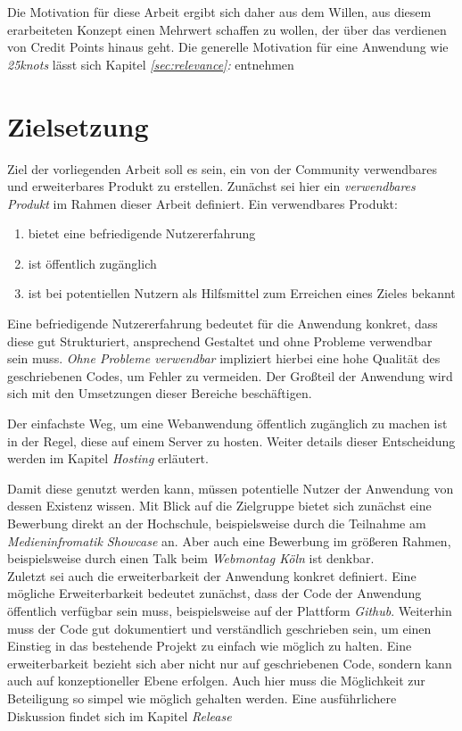 Die Motivation für diese Arbeit ergibt sich daher aus dem Willen, aus diesem erarbeiteten Konzept einen Mehrwert schaffen zu wollen, der über das verdienen von Credit Points hinaus geht. Die generelle Motivation für eine Anwendung wie \textit{25knots} lässt sich Kapitel \textit{\ref{sec:relevance}: } entnehmen

\section{Zielsetzung}
Ziel der vorliegenden Arbeit soll es sein, ein von der Community verwendbares und erweiterbares Produkt zu erstellen. Zunächst sei hier ein \textit{verwendbares Produkt} im Rahmen dieser Arbeit definiert. Ein verwendbares Produkt:

\begin{enumerate}
  \item bietet eine befriedigende Nutzererfahrung
  \item ist öffentlich zugänglich
  \item ist bei potentiellen Nutzern als Hilfsmittel zum Erreichen eines Zieles bekannt
\end{enumerate}

Eine befriedigende Nutzererfahrung bedeutet für die Anwendung konkret, dass diese gut Strukturiert, ansprechend Gestaltet und ohne Probleme verwendbar sein muss. \textit{Ohne Probleme verwendbar} impliziert hierbei eine hohe Qualität des geschriebenen Codes, um Fehler zu vermeiden. Der Großteil der Anwendung wird sich mit den Umsetzungen dieser Bereiche beschäftigen.

Der einfachste Weg, um eine Webanwendung öffentlich zugänglich zu machen ist in der Regel, diese auf einem Server zu hosten. Weiter details dieser Entscheidung werden im Kapitel \textit{Hosting} erläutert.

Damit diese genutzt werden kann, müssen potentielle Nutzer der Anwendung von dessen Existenz wissen. Mit Blick auf die Zielgruppe bietet sich zunächst eine Bewerbung direkt an der Hochschule, beispielsweise durch die Teilnahme am \textit{Medieninfromatik Showcase} an. Aber auch eine Bewerbung im größeren Rahmen, beispielsweise durch einen Talk beim \textit{Webmontag Köln} ist denkbar.\\

Zuletzt sei auch die erweiterbarkeit der Anwendung konkret definiert. Eine mögliche Erweiterbarkeit bedeutet zunächst, dass der Code der Anwendung öffentlich verfügbar sein muss, beispielsweise auf der Plattform \textit{Github}. Weiterhin muss der Code gut dokumentiert und verständlich geschrieben sein, um einen Einstieg in das bestehende Projekt zu einfach wie möglich zu halten. Eine erweiterbarkeit bezieht sich aber nicht nur auf geschriebenen Code, sondern kann auch auf konzeptioneller Ebene erfolgen. Auch hier muss die Möglichkeit zur Beteiligung so simpel wie möglich gehalten werden. Eine ausführlichere Diskussion findet sich im Kapitel \textit{Release}\\

